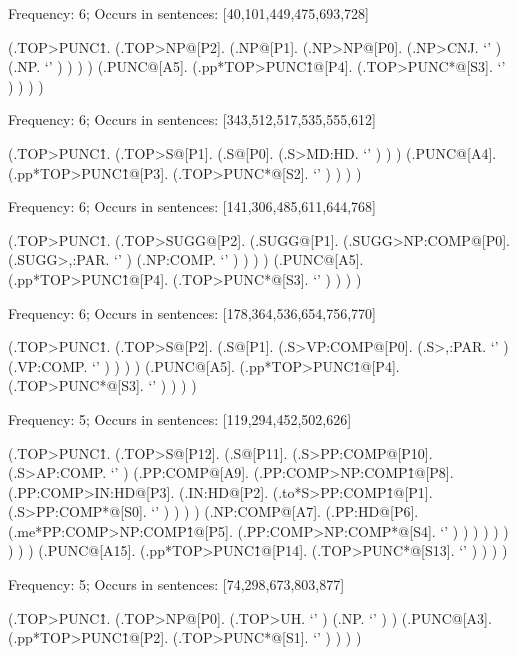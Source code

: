 \documentclass[10pt]{article}
\begin{document}
Frequency: 6; Occurs in sentences: [40,101,449,475,693,728]


\begin{parsetree} (.TOP>PUNC\^1. (.TOP>NP@[P2]. (.NP@[P1]. (.NP>NP@[P0]. (.NP>CNJ. `' ) (.NP. `' ) ) ) ) (.PUNC@[A5]. (.pp*TOP>PUNC\^1@[P4]. (.TOP>PUNC*@[S3]. `' ) ) ) ) \end{parsetree}

Frequency: 6; Occurs in sentences: [343,512,517,535,555,612]


\begin{parsetree} (.TOP>PUNC\^1. (.TOP>S@[P1]. (.S@[P0]. (.S>MD:HD. `' ) ) ) (.PUNC@[A4]. (.pp*TOP>PUNC\^1@[P3]. (.TOP>PUNC*@[S2]. `' ) ) ) ) \end{parsetree}

Frequency: 6; Occurs in sentences: [141,306,485,611,644,768]


\begin{parsetree} (.TOP>PUNC\^1. (.TOP>SUGG@[P2]. (.SUGG@[P1]. (.SUGG>NP:COMP@[P0]. (.SUGG>,:PAR. `' ) (.NP:COMP. `' ) ) ) ) (.PUNC@[A5]. (.pp*TOP>PUNC\^1@[P4]. (.TOP>PUNC*@[S3]. `' ) ) ) ) \end{parsetree}

Frequency: 6; Occurs in sentences: [178,364,536,654,756,770]


\begin{parsetree} (.TOP>PUNC\^1. (.TOP>S@[P2]. (.S@[P1]. (.S>VP:COMP@[P0]. (.S>,:PAR. `' ) (.VP:COMP. `' ) ) ) ) (.PUNC@[A5]. (.pp*TOP>PUNC\^1@[P4]. (.TOP>PUNC*@[S3]. `' ) ) ) ) \end{parsetree}

Frequency: 5; Occurs in sentences: [119,294,452,502,626]


\begin{parsetree} (.TOP>PUNC\^1. (.TOP>S@[P12]. (.S@[P11]. (.S>PP:COMP@[P10]. (.S>AP:COMP. `' ) (.PP:COMP@[A9]. (.PP:COMP>NP:COMP\^1@[P8]. (.PP:COMP>IN:HD@[P3]. (.IN:HD@[P2]. (.to*S>PP:COMP\^1@[P1]. (.S>PP:COMP*@[S0]. `' ) ) ) ) (.NP:COMP@[A7]. (.PP:HD@[P6]. (.me*PP:COMP>NP:COMP\^1@[P5]. (.PP:COMP>NP:COMP*@[S4]. `' ) ) ) ) ) ) ) ) ) (.PUNC@[A15]. (.pp*TOP>PUNC\^1@[P14]. (.TOP>PUNC*@[S13]. `' ) ) ) ) \end{parsetree}

Frequency: 5; Occurs in sentences: [74,298,673,803,877]


\begin{parsetree} (.TOP>PUNC\^1. (.TOP>NP@[P0]. (.TOP>UH. `' ) (.NP. `' ) ) (.PUNC@[A3]. (.pp*TOP>PUNC\^1@[P2]. (.TOP>PUNC*@[S1]. `' ) ) ) ) \end{parsetree}
\end{document}
